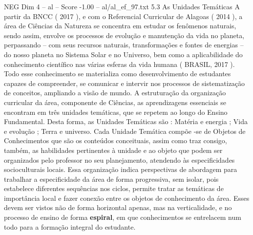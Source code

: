 \begin{textsample}{NEG Dim 4 – al – Score -1.00 – al/al\_ef\_97.txt}  \label{ex:f4_neg_247}
5.3 As Unidades Temáticas A partir da BNCC ( 2017 ), e com o Referencial Curricular de Alagoas ( 2014 ), a área de Ciências da Natureza se concentra em estudar os fenômenos naturais, sendo assim, envolve os processos de evolução e manutenção da vida no planeta, perpassando – com seus recursos naturais, transformações e fontes de energias – do nosso planeta no Sistema Solar e no Universo, bem como a aplicabilidade do conhecimento científico nas várias esferas da vida humana ( BRASIL, 2017 ).
Todo esse conhecimento se materializa como desenvolvimento de estudantes capazes de compreender, se comunicar e intervir nos processos de sistematização de conceitos, ampliando a visão de mundo.
A estruturação da organização curricular da área, componente de Ciências, as aprendizagens essenciais se encontram em três unidades temáticas, que se repetem ao longo do Ensino Fundamental.
Desta forma, as Unidades Temáticas são : Matéria e energia ; Vida e evolução ; Terra e universo.
Cada Unidade Temática compõe -se de Objetos de Conhecimentos que são os conteúdos conceituais, assim como traz consigo, também, as habilidades pertinentes à unidade e ao objeto que podem ser organizados pelo professor no seu planejamento, atendendo às especificidades socioculturais locais.
Essa organização indica perspectivas de abordagem para trabalhar a especificidade da área de forma progressiva, sem isolar, pois estabelece diferentes sequências nos ciclos, permite tratar as temáticas de importância local e fazer conexão entre os objetos de conhecimento da área.
Esses devem ser vistos não de forma horizontal apenas, mas na verticalidade, e no processo de ensino de forma \textbf{espiral}, em que conhecimentos se entrelacem num todo para a formação integral do estudante.

\end{textsample}

